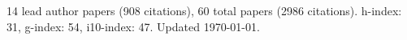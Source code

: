 14 lead author papers (908 citations),
60 total papers (2986 citations).\newline
h-index: 31, g-index: 54, i10-index: 47. Updated \today.